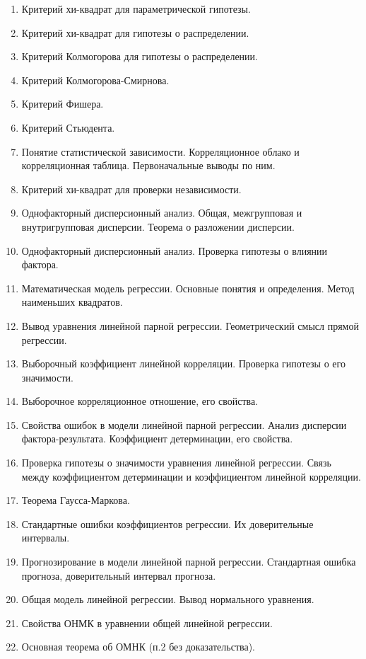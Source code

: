 \documentclass[12pt]{article}
\begin{document}
\begin{enumerate}
    \item Критерий хи-квадрат для параметрической гипотезы.
    \item Критерий хи-квадрат для гипотезы о распределении.
    \item Критерий Колмогорова для гипотезы о распределении.
    \item Критерий Колмогорова-Смирнова.
    \item Критерий Фишера.
    \item Критерий Стьюдента.
    \item Понятие статистической зависимости. Корреляционное облако и корреляционная таблица. Первоначальные выводы по ним.
    \item Критерий хи-квадрат для проверки независимости.
    \item Однофакторный дисперсионный анализ. Общая, межгрупповая и внутригрупповая дисперсии. Теорема о разложении дисперсии.
    \item Однофакторный дисперсионный анализ. Проверка гипотезы о влиянии фактора.
    \item Математическая модель регрессии. Основные понятия и определения. Метод наименьших квадратов.
    \item Вывод уравнения линейной парной регрессии. Геометрический смысл прямой регрессии.
    \item Выборочный коэффициент линейной корреляции. Проверка гипотезы о его значимости.
    \item Выборочное корреляционное отношение, его свойства.
    \item Свойства ошибок в модели линейной парной регрессии. Анализ дисперсии фактора-результата. Коэффициент детерминации, его свойства.
    \item Проверка гипотезы о значимости уравнения линейной регрессии. Связь между коэффициентом детерминации и коэффициентом линейной корреляции.
    \item Теорема Гаусса-Маркова.
    \item Стандартные ошибки коэффициентов регрессии. Их доверительные интервалы.
    \item Прогнозирование в модели линейной парной регрессии. Стандартная ошибка прогноза, доверительный интервал прогноза.
    \item Общая модель линейной регрессии. Вывод нормального уравнения.
    \item Свойства ОНМК в уравнении общей линейной регрессии.
    \item Основная теорема об ОМНК (п.2 без доказательства).

\end{enumerate}
\end{document}
